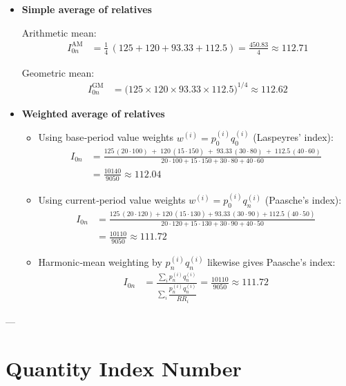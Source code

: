 \documentclass[twoside]{book}
\begin{document}
\begin{itemize}
\item \textbf{Simple average of relatives}

Arithmetic mean:
\begin{align*}
I_{0n}^{\mathrm{AM}}
  &= \frac{1}{4}\,(125 + 120 + 93.33 + 112.5)
  = \frac{450.83}{4} \approx 112.71
\end{align*}

Geometric mean:
\begin{align*}
I_{0n}^{\mathrm{GM}}
  &= \bigl(125 \times 120 \times 93.33 \times 112.5\bigr)^{1/4}
  \approx 112.62
\end{align*}

\item \textbf{Weighted average of relatives}
\begin{itemize}
\item Using base‐period value weights $w^{(i)} = p_0^{(i)}q_0^{(i)}$ (Laspeyres' index):
\begin{align*}
I_{0n}
  &= \frac{125\,(20\cdot100) \;+\; 120\,(15\cdot150)\;+\;93.33\,(30\cdot80)\;+\;112.5\,(40\cdot60)}
         {20\cdot100 + 15\cdot150 + 30\cdot80 + 40\cdot60}\\
  &= \frac{10140}{9050} \approx 112.04
\end{align*}

\item Using current‐period value weights $w^{(i)} = p_0^{(i)}q_n^{(i)}$ (Paasche's index):
\begin{align*}
I_{0n}
  &= \frac{125\,(20\cdot120) + 120\,(15\cdot130) + 93.33\,(30\cdot90) + 112.5\,(40\cdot50)}
         {20\cdot120 + 15\cdot130 + 30\cdot90 + 40\cdot50}\\
  &= \frac{10110}{9050} \approx 111.72
\end{align*}

\item Harmonic‐mean weighting by $p_n^{(i)}q_n^{(i)}$ likewise gives Paasche's index:
\begin{align*}
I_{0n}
  &= \frac{\displaystyle\sum_i p_n^{(i)}q_n^{(i)}}{\displaystyle\sum_i \dfrac{p_n^{(i)}q_n^{(i)}}{RR_i}}
  = \frac{10110}{9050} \approx 111.72
\end{align*}
\end{itemize}
\end{itemize}

---

\section{Quantity Index Number}
\end{document}
